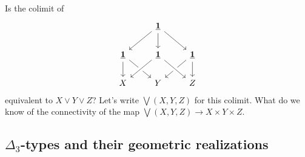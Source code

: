 \begin{rmk}
Is the colimit of
\begin{equation*}
\begin{tikzcd}
& \unit \arrow[dl] \arrow[d] \arrow[dr] \\
\unit \arrow[d] \arrow[dr] & \unit \arrow[dl,crossing over] & \unit \arrow[dl] \arrow[d] \\
X & Y & Z \arrow[from=ul,crossing over] 
\end{tikzcd}
\end{equation*}
equivalent to $X\vee Y \vee Z$? Let's write $\bigvee(X,Y,Z)$ for this colimit. What do we know of the connectivity of the map $\bigvee(X,Y,Z)\to X\times Y\times Z$. 
\end{rmk}

\subsection{$\Delta_3$-types and their geometric realizations}
